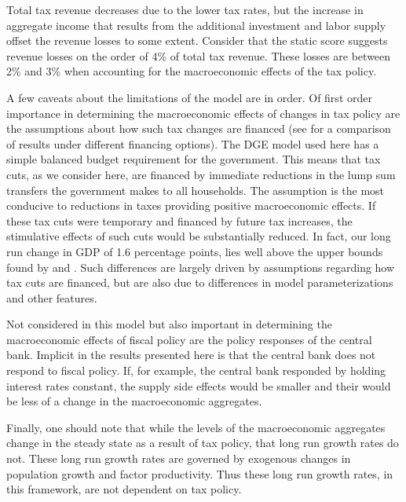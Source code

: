 \documentclass[letterpaper,12pt]{article}
\theoremstyle{definition}
\begin{document}
\begin{spacing}{1.5}
  Total tax revenue decreases due to the lower tax rates, but the increase in aggregate income that results from the additional investment and labor supply offset the revenue losses to some extent.  Consider that the static score suggests revenue losses on the order of 4\% of total tax revenue. These losses are between 2\% and 3\% when accounting for the macroeconomic effects of the tax policy.

  A few caveats about the limitations of the model are in order.  Of first order importance in determining the macroeconomic effects of changes in tax policy are the assumptions about how such tax changes are financed (see \citet{DM2011} for a comparison of results under different financing options).  The DGE model used here has a simple balanced budget requirement for the government. This means that tax cuts, as we consider here, are financed by immediate reductions in the lump sum transfers the government makes to all households. The assumption is the most conducive to reductions in taxes providing positive macroeconomic effects.  If these tax cuts were temporary and financed by future tax increases, the stimulative effects of such cuts would be substantially reduced.  In fact, our long run change in GDP of 1.6 percentage points, lies well above the upper bounds found by \citet{DM2011} and \citet{CBO2004}.  Such differences are largely driven by assumptions regarding how tax cuts are financed, but are also due to differences in model parameterizations and other features.

  Not considered in this model but also important in determining the macroeconomic effects of fiscal policy are the policy responses of the central bank.  Implicit in the results presented here is that the central bank does not respond to fiscal policy.  If, for example, the central bank responded by holding interest rates constant, the supply side effects would be smaller and their would be less of a change in the macroeconomic aggregates.

  Finally, one should note that while the levels of the macroeconomic aggregates change in the steady state as a result of tax policy, that long run growth rates do not.  These long run growth rates are governed by exogenous changes in population growth and factor productivity.  Thus these long run growth rates, in this framework, are not dependent on tax policy.





  \clearpage


\end{spacing}
\end{document}
